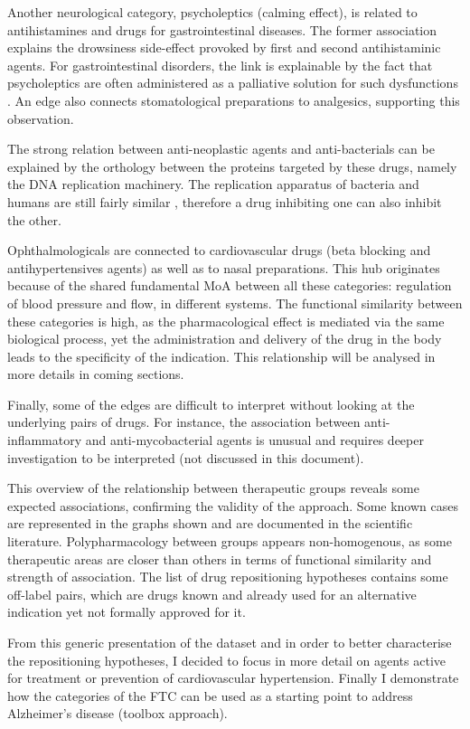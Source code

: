 Another neurological category, psycholeptics (calming effect), is related to antihistamines and drugs for gastrointestinal diseases. The former association explains the drowsiness side-effect provoked by first and second antihistaminic agents. For gastrointestinal disorders, the link is explainable by the fact that psycholeptics are often administered as a palliative solution for such dysfunctions \citep{atca03}. An edge also connects stomatological preparations to analgesics, supporting this observation.

The strong relation between anti-neoplastic agents and anti-bacterials can be explained by the orthology between the proteins targeted by these drugs, namely the DNA replication machinery. The replication apparatus of bacteria and humans are still fairly similar \citep{hurle2013computational}, therefore a drug inhibiting one can also inhibit the other.

Ophthalmologicals are connected to cardiovascular drugs (beta blocking and antihypertensives agents) as well as to nasal preparations. This hub originates because of the shared fundamental MoA between all these categories: regulation of blood pressure and flow, in different systems. The functional similarity between these categories is high, as the pharmacological effect is mediated via the same biological process, yet the administration and delivery of the drug in the body leads to the specificity of the indication. This relationship will be analysed in more details in coming sections.

Finally, some of the edges are difficult to interpret without looking at the underlying pairs of drugs. For instance, the association between anti-inflammatory and anti-mycobacterial agents is unusual and requires deeper investigation to be interpreted (not discussed in this document).

This overview of the relationship between therapeutic groups reveals some expected associations, confirming the validity of the approach. Some known cases are represented in the graphs shown and are documented in the scientific literature. Polypharmacology between groups appears non-homogenous, as some therapeutic areas are closer than others in terms of functional similarity and strength of association. The list of drug repositioning hypotheses contains some off-label pairs, which are drugs known and already used for an alternative indication yet not formally approved for it.

From this generic presentation of the dataset and in order to better characterise the repositioning hypotheses, I decided to focus in more detail on agents active for treatment or prevention of cardiovascular hypertension. Finally I demonstrate how the categories of the FTC can be used as a starting point to address Alzheimer's disease (toolbox approach).

